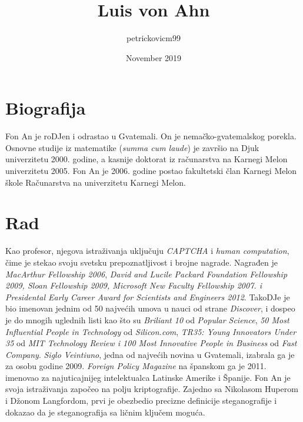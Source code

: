 \documentclass{article}
\title{Luis von Ahn}
\author{petrickovicm99 }
\date{November 2019}
\begin{document}
\maketitle

\section{Biografija}
Fon An je roDJen i odrastao u Gvatemali. On je nemačko-gvatemalskog porekla. 
Osnovne studije iz matematike (\textit{summa cum laude}) je završio na Djuk univerzitetu 2000. godine, a kasnije doktorat iz računarstva na Karnegi Melon univerzitetu 2005.
Fon An je 2006. godine postao fakultetski član Karnegi Melon škole Računarstva na univerzitetu Karnegi Melon.

\section{Rad}
Kao profesor, njegova istraživanja uključuju \textit{CAPTCHA} i \textit{human computation}, čime je stekao svoju svetsku prepoznatljivost i brojne nagrade. Nagrađen je \textit{MacArthur Fellowship 2006}, \textit{David and Lucile Packard Foundation Fellowship 2009, Sloan Fellowship 2009, Microsoft New Faculty Fellowship 2007. i Presidental Early Career Award for Scientists and Engineers 2012}. TakoDJe je bio imenovan jednim od 50 najvećih umova u nauci od strane \textit{Discover}, i dospeo je do mnogih uglednih listi kao što su \textit{Briliant 10} od \textit{Popular Science}, \textit{50 Most Influential People in Technology} od \textit{Silicon.com}, \textit{TR35: Young Innovators Under 35} od \textit{MIT Technology Review i 100 Most Innovative People in Business} od \textit{Fast Company}. 
\textit{Siglo Veintiuno}, jedna od najvećih novina u Gvatemali, izabrala ga je za osobu godine 2009. \textit{Foreign Policy Magazine} na španskom ga je 2011. imenovao za najuticajnijeg intelektualca Latinske Amerike i Španije. 
Fon An je svoja istraživanja započeo na polju kriptografije. Zajedno sa Nikolasom Huperom i Džonom Langfordom, prvi je obezbedio precizne definicije steganografije i dokazao da je steganografija sa ličnim ključem moguća.
\end{document}

